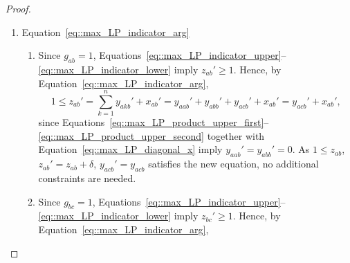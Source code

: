 \documentclass[11pt]{article}
\begin{document}
\begin{proof}
\begin{enumerate}[label=\Alph*.]
\begin{enumerate}[label=(\roman*)]
          \begin{equation} \label{eq::y_aba}
            y_{aba}' = x_{ab}'
          \end{equation} 
          is an additional constraint that is needed.
        \item  Since $g_{bb}=0$, Equations~\eqref{eq::max_LP_indicator_upper}--\eqref{eq::max_LP_indicator_lower} imply $z_{bb}'=0$. Therefore, as in above
          \[
          0 = z_{bb}' = \sum_{k\in\{a,b,c\}}y_{bkb}' -\sum_{k\in\{a,b,c\}}x_{bk}' = y_{bab}' + y_{bcb}' - x_{ba}' - x_{bc}'.
          \]
          Since $x_{ba}'=x_{ab}'$ by Equation~\eqref{eq::max_LP_symmetry_x} and
          $x_{bc}'=x_{bc}$, it follows that
          \begin{equation} \label{eq::y_bab_bcb}
            y_{bab}' + y_{bcb}' = x_{ab}' + x_{bc}'
          \end{equation}
          is an additional constraint that is needed.
        \item Since $g_{cc}=0$, Equations~\eqref{eq::max_LP_indicator_upper}--\eqref{eq::max_LP_indicator_lower} imply $z_{cc}'=0$. Therefore, as in above
          \[
          0 = \sum_{k\in\{a,b,c\}}y_{ckc}' -\sum_{k\in\{a,b,c\}}x_{ck}' = y_{cac}' + y_{cbc}' - x_{ca}' -x_{cb}'.
          \]
          Since $x_{ca}'=0=x_{ca}$ by Lemma~\ref{lemma::two_edges_linear_sum} and $x_{cb}'=x_{bc}$, this equation is unchanged and the original values of $y_{cac}'=y_{cac}$ and $y_{cbc}'=y_{cbc}$ remain feasible and no additional constraints are needed. 
      \end{enumerate}
    \item Equation~\eqref{eq::max_LP_indicator_arg}
      \begin{enumerate}[label=(\roman*)]
        \item Since $g_{ab}=1$, Equations~\eqref{eq::max_LP_indicator_upper}--\eqref{eq::max_LP_indicator_lower} imply $z_{ab}' \geq 1$. Hence, by Equation~\eqref{eq::max_LP_indicator_arg},
          \[
          1 \leq z_{ab}' = \sum_{k = 1}^{n}y_{akb}' + x_{ab}' = y_{aab}'+y_{abb}'+y_{acb}'+x_{ab}'=y_{acb}'+x_{ab}',
          \]
          since Equations~\eqref{eq::max_LP_product_upper_first}--\eqref{eq::max_LP_product_upper_second} together with Equation~\eqref{eq::max_LP_diagonal_x} imply $y_{aab}'=y_{abb}'=0$.  As $1 \leq z_{ab}$, $z_{ab}' = z_{ab} + \delta$, $y_{acb}' = y_{acb}$ satisfies the new equation, no additional constraints are needed. 
        \item  Since $g_{bc}=1$, Equations~\eqref{eq::max_LP_indicator_upper}--\eqref{eq::max_LP_indicator_lower} imply $z_{bc}'\geq 1$. Hence, by Equation~\eqref{eq::max_LP_indicator_arg},

\end{enumerate}
\end{enumerate}
\end{proof}
\end{document}
